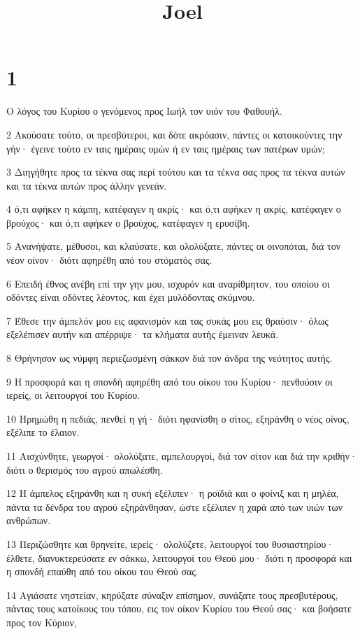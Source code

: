 

\title{Joel}


\chapter{1}

\par Ο λόγος του Κυρίου ο γενόμενος προς Ιωήλ τον υιόν του Φαθουήλ.
\par 2 Ακούσατε τούτο, οι πρεσβύτεροι, και δότε ακρόασιν, πάντες οι κατοικούντες την γήν· έγεινε τούτο εν ταις ημέραις υμών ή εν ταις ημέραις των πατέρων υμών;
\par 3 Διηγήθητε προς τα τέκνα σας περί τούτου και τα τέκνα σας προς τα τέκνα αυτών και τα τέκνα αυτών προς άλλην γενεάν.
\par 4 ό,τι αφήκεν η κάμπη, κατέφαγεν η ακρίς· και ό,τι αφήκεν η ακρίς, κατέφαγεν ο βρούχος· και ό,τι αφήκεν ο βρούχος, κατέφαγεν η ερυσίβη.
\par 5 Ανανήψατε, μέθυσοι, και κλαύσατε, και ολολύξατε, πάντες οι οινοπόται, διά τον νέον οίνον· διότι αφηρέθη από του στόματός σας.
\par 6 Επειδή έθνος ανέβη επί την γην μου, ισχυρόν και αναρίθμητον, του οποίου οι οδόντες είναι οδόντες λέοντος, και έχει μυλόδοντας σκύμνου.
\par 7 Έθεσε την άμπελόν μου εις αφανισμόν και τας συκάς μου εις θραύσιν· όλως εξελέπισεν αυτήν και απέρριψε· τα κλήματα αυτής έμειναν λευκά.
\par 8 Θρήνησον ως νύμφη περιεζωσμένη σάκκον διά τον άνδρα της νεότητος αυτής.
\par 9 Η προσφορά και η σπονδή αφηρέθη από του οίκου του Κυρίου· πενθούσιν οι ιερείς, οι λειτουργοί του Κυρίου.
\par 10 Ηρημώθη η πεδιάς, πενθεί η γή· διότι ηφανίσθη ο σίτος, εξηράνθη ο νέος οίνος, εξέλιπε το έλαιον.
\par 11 Αισχύνθητε, γεωργοί· ολολύξατε, αμπελουργοί, διά τον σίτον και διά την κριθήν· διότι ο θερισμός του αγρού απωλέσθη.
\par 12 Η άμπελος εξηράνθη και η συκή εξέλιπεν· η ροϊδιά και ο φοίνιξ και η μηλέα, πάντα τα δένδρα του αγρού εξηράνθησαν, ώστε εξέλιπεν η χαρά από των υιών των ανθρώπων.
\par 13 Περιζώσθητε και θρηνείτε, ιερείς· ολολύζετε, λειτουργοί του θυσιαστηρίου· έλθετε, διανυκτερεύσατε εν σάκκω, λειτουργοί του Θεού μου· διότι η προσφορά και η σπονδή επαύθη από του οίκου του Θεού σας.
\par 14 Αγιάσατε νηστείαν, κηρύξατε σύναξιν επίσημον, συνάξατε τους πρεσβυτέρους, πάντας τους κατοίκους του τόπου, εις τον οίκον Κυρίου του Θεού σας· και βοήσατε προς τον Κύριον,
